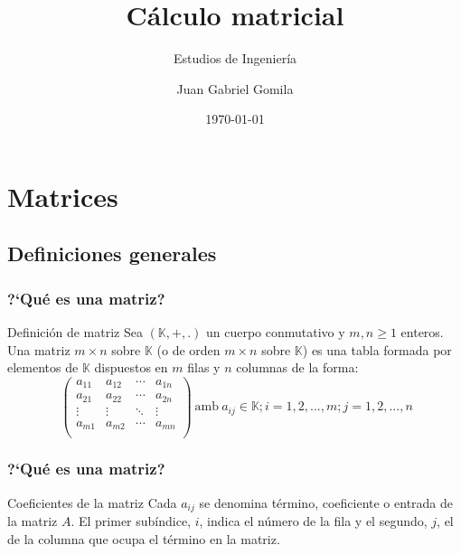 \documentclass[aspectratio=169]{beamer}
\title[Tema 1 - Matrices, sistemas y determinantes]{C\'{a}lculo matricial}
\subtitle{Estudios de Ingenier\'ia}
\author[https://frogames.es]{
Juan Gabriel Gomila%
}
\institute[Frogames]{
 Frogames
   \and
  \texttt{https://frogames.es}
}
\date{\today}
\begin{document}
 

\frame{\titlepage}


\section{Matrices}
\subsection{Definiciones generales}



\begin{frame}
  \frametitle{?`Qu\'e es una matriz?}
  \begin{block}{Definici\'{o}n de matriz}
Sea $(\mathbb{K}, +, .)$ un cuerpo conmutativo y $m, n \geq 1$ enteros. Una matriz $m \times n$ sobre $\mathbb{K}$ (o de orden $m \times n$ sobre $\mathbb{K}$) es una tabla formada por elementos de $\mathbb{K}$ dispuestos en $m$ filas y $n$ columnas de la forma:
\[\   \left(\begin{matrix} %
      a_{11} & a_{12} & \cdots & a_{1n} \\
 a_{21} & a_{22} & \cdots & a_{2n} \\
  \vdots & \vdots & \ddots & \vdots \\
   a_{m1} & a_{m2} & \cdots & a_{mn} \\
    \end{matrix}\right)
    \ \mathrm{amb}\ a_{ij} \in \mathbb{K}; i=1,2,...,m; j =1,2,...,n\]

  \end{block}
\end{frame}


\begin{frame}
  \frametitle{?`Qu\'{e} es una matriz?}   
  \begin{block}{Coeficientes de la matriz}
Cada $a_{ij}$ se denomina t\'ermino, coeficiente o entrada de la matriz $A$. El primer sub\'indice, $i$, indica el n\'umero de la fila y el segundo, $j$, el de la columna que ocupa el t\'ermino en la matriz.
  \end{block}
\end{frame}

\end{document}
